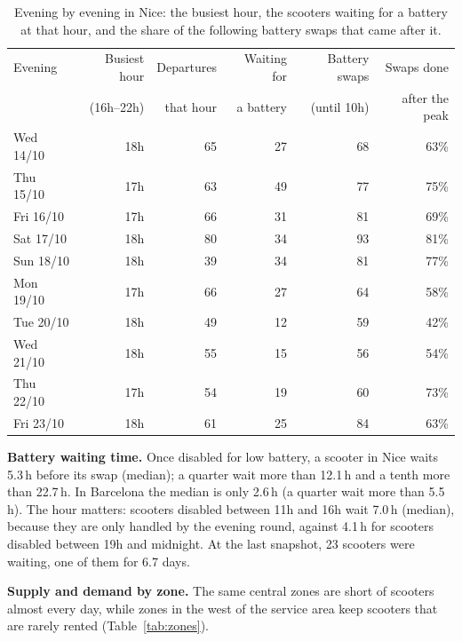 \documentclass[11pt,a4paper]{article}
\begin{document}
\begin{table}[ht]
  \centering
  \small
  \begin{tabular}{lrrrrr}
    \toprule
    Evening & Busiest hour & Departures & Waiting for & Battery swaps & Swaps done \\
            & (16h--22h)   & that hour  & a battery   & (until 10h)   & after the peak \\
    \midrule
    Wed 14/10 & 18h & 65 & 27 & 68 & 63\% \\
    Thu 15/10 & 17h & 63 & 49 & 77 & 75\% \\
    Fri 16/10 & 17h & 66 & 31 & 81 & 69\% \\
    Sat 17/10 & 18h & 80 & 34 & 93 & 81\% \\
    Sun 18/10 & 18h & 39 & 34 & 81 & 77\% \\
    Mon 19/10 & 17h & 66 & 27 & 64 & 58\% \\
    Tue 20/10 & 18h & 49 & 12 & 59 & 42\% \\
    Wed 21/10 & 18h & 55 & 15 & 56 & 54\% \\
    Thu 22/10 & 17h & 54 & 19 & 60 & 73\% \\
    Fri 23/10 & 18h & 61 & 25 & 84 & 63\% \\
    \bottomrule
  \end{tabular}
  \caption{Evening by evening in Nice: the busiest hour, the scooters waiting for a battery at
  that hour, and the share of the following battery swaps that came after it.}
  \label{tab:evenings}
\end{table}


\textbf{Battery waiting time.} Once disabled for low battery, a scooter in Nice waits
5.3\,h before its swap (median); a quarter wait more than 12.1\,h and a tenth more than
22.7\,h. In Barcelona the median is only 2.6\,h (a quarter wait more than 5.5\,h). The hour matters: scooters disabled between 11h and
16h wait 7.0\,h (median), because they are only handled by the evening round, against
4.1\,h for scooters disabled between 19h and midnight. At the last snapshot,
23 scooters were waiting, one of them for 6.7 days.

\textbf{Supply and demand by zone.} The same central zones are short of scooters almost every day,
while zones in the west of the service area keep scooters that are rarely rented
(Table~\ref{tab:zones}).
\end{document}
